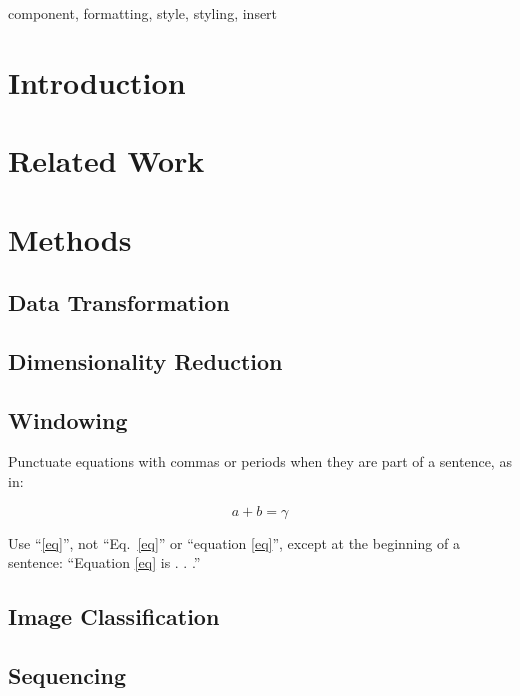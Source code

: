 \documentclass[conference]{IEEEtran}
\begin{document}
\begin{IEEEkeywords}
component, formatting, style, styling, insert
\end{IEEEkeywords}

\section{Introduction}



\section{Related Work}



\section{Methods}



\subsection{Data Transformation}\label{DT}



\subsection{Dimensionality Reduction}\label{DR}



\subsection{Windowing}\label{Windowing}

Punctuate equations with commas or periods when they are part of a sentence, as in:

\begin{equation}
a+b=\gamma\label{eq}
\end{equation}

Use ``\eqref{eq}'', not ``Eq.~\eqref{eq}'' or ``equation \eqref{eq}'', except at 
the beginning of a sentence: ``Equation \eqref{eq} is . . .''

\subsection{Image Classification}\label{ImgCl}



\subsection{Sequencing}\label{SQC}
\end{document}
